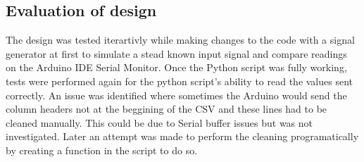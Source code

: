 \subsection{Evaluation of design}
The design was tested iterartivly while making changes to the code with a signal generator at first to simulate a stead known input signal and compare readings on the Arduino IDE Serial Monitor. Once the Python script was fully working, tests were performed again for the python script's ability to read the values sent correctly. An issue was identified where sometimes the Arduino would send the column headers not at the beggining of the CSV and these lines had to be cleaned manually. This could be due to Serial buffer issues but was not investigated. Later an attempt was made to perform the cleaning programatically by creating a function in the script to do so.

